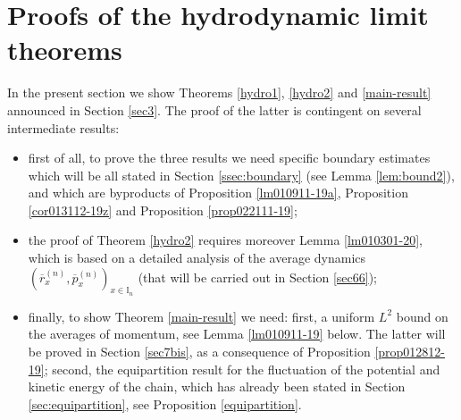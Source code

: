 \documentclass[EJP]{ejpecp} %
\newcommand\T{{\mathbb I}}
\renewcommand{\bar}{\overline}
\numberwithin{equation}{section}
\begin{document}



\section{Proofs of the hydrodynamic limit theorems}


\label{sec:form-deriv-equat}

In the present section we show  Theorems \ref{hydro1}, \ref{hydro2}
and \ref{main-result} announced in Section \ref{sec3}. 
The proof of the latter is contingent on several intermediate  results: 
\begin{itemize}
\item first of all, to prove the three results we need specific boundary estimates which will be all stated in Section \ref{ssec:boundary} (see Lemma \ref{lem:bound2}), and which are byproducts of Proposition \ref{lm010911-19a}, Proposition \ref{cor013112-19z} and Proposition \ref{prop022111-19};
\item the proof of Theorem \ref{hydro2} requires moreover Lemma \ref{lm010301-20}, which is based on a detailed analysis of
the average dynamics $(\bar r_x^{(n)},\bar p_x^{(n)})_{x\in\T_n}$ (that
will be carried out in Section \ref{sec66});
\item finally, to show Theorem \ref{main-result} we need: first, a uniform $L^2$ bound on the averages of momentum, see Lemma \ref{lm010911-19} below. The latter will be proved in Section \ref{sec7bis}, as a consequence of Proposition \ref{prop012812-19}; second, the equipartition  result for the fluctuation of the potential and kinetic energy
of the chain, which has already been stated in Section \ref{sec:equipartition}, see Proposition \ref{equipartition}.
\end{itemize}


 
\end{document}
